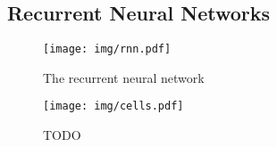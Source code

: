 \subsection{Recurrent Neural Networks}
\begin{figure}[H]
	\centering
	\texttt{[image: img/rnn.pdf]}
	\caption{The recurrent neural network}
	\label{fig:rnn}
\end{figure}
\begin{figure}[H]
	\begin{center}
		\texttt{[image: img/cells.pdf]}
		\caption{TODO}
		\label{fig:cells}
	\end{center}
\end{figure}

